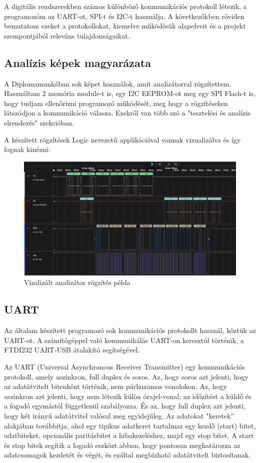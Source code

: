 \documentclass[a4paper,12pt,oneside]{book}
\begin{document}
A digitális rendszerekben számos különböző kommunikációs protokoll létezik, a programozóm az UART-ot, SPI-t és I2C-t használja. A következőkben röviden bemutatom ezeket a protokollokat, kiemelve működésük alapelveit és a projekt szempontjából releváns tulajdonságaikat.

\subsection{Analízis képek magyarázata} %

A Diplomamunkában sok képet használok, amit analizátorral rögzítettem. Használtam 2 memória module-t is, egy I2C EEPROM-ot meg egy SPI Flash-t is, hogy tudjam ellenőrizni programozó működését, meg hogy a rögzítéseken látszódjon a kommunikáció válasza. Ezekről van több szó a "tesztelési és analízis elrendezés" szekcióban. 

A készített rögzítések Logic nevezetű applikációval vannak vizualizálva és így fognak kinézni:
\begin{figure}[H]
	\centering
	\includegraphics[trim=1mm 1mm 1mm 1mm,scale=0.3]{i2c small read.PNG}
	\caption{Vizalizált analizátor rögzítés példa}
	\label{Vizalizált analizátor rögzítés példa}
\end{figure}


\subsection{UART}%
Az általam készített programozó sok kommunikációs protokollt használ, köztük az UART-ot. A számítógéppel való kommunikálás UART-on keresztül történik, a FTDI232 UART-USB átalakító segítségével.



Az UART (Universal Asynchronous Receiver Transmitter) egy kommunikációs protokoll, amely aszinkron, full duplex és soros. Az, hogy soros azt jelenti, hogy az adatátvitelt bitenként történik, nem párhuzamos vonalokon. Az, hogy aszinkron azt jelenti, hogy nem létezik külön órajel-vonal; az időzítést a küldő és a fogadó egymástól függetlenül szabályozza. És az, hogy full duplex azt jelenti, hogy két irányú adatátvitel valósul meg egyidejűleg.
Az adatokat "keretek” alakjában továbbítja, ahol egy tipikus adatkeret tartalmaz egy kezdő (start) bitet, adatbiteket, opcionális paritásbitet a hibakezeléshez, majd egy stop bitet. A start és stop bitek segítik a fogadó eszközt abban, hogy pontosan meghatározza az adatcsomagok kezdetét és végét, és ezáltal megbízható adatátvitelt biztosítanak.
\end{document}
